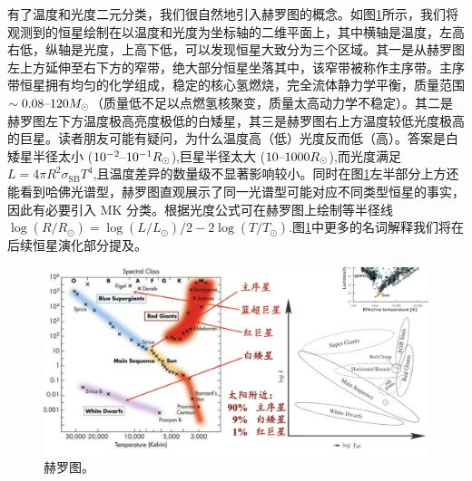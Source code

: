 \documentclass[../天体物理基础.tex]{subfiles}
\begin{document}
有了温度和光度二元分类，我们很自然地引入赫罗图的概念。如图\ref{赫罗图。}所示，我们将观测到的恒星绘制在以温度和光度为坐标轴的二维平面上，其中横轴是温度，左高右低，纵轴是光度，上高下低，可以发现恒星大致分为三个区域。其一是从赫罗图左上方延伸至右下方的窄带，绝大部分恒星坐落其中，该窄带被称作主序带。主序带恒星拥有均匀的化学组成，稳定的核心氢燃烧，完全流体静力学平衡，质量范围$\sim0.08\text{\textendash}120M_{\odot}$（质量低不足以点燃氢核聚变，质量太高动力学不稳定）。其二是赫罗图左下方温度极高亮度极低的白矮星，其三是赫罗图右上方温度较低光度极高的巨星。读者朋友可能有疑问，为什么温度高（低）光度反而低（高）。答案是白矮星半径太小 ($10^{-2}\text{\textendash}10^{-1}R_{\odot}$),巨星半径太大 ($10\text{\textendash}1000R_{\odot}$),而光度满足$L=4\pi R^{2}\sigma_{\text{SB}}T^{4}$,且温度差异的数量级不显著影响较小。同时在图\ref{赫罗图。}左半部分上方还能看到哈佛光谱型，赫罗图直观展示了同一光谱型可能对应不同类型恒星的事实，因此有必要引入 MK 分类。根据光度公式可在赫罗图上绘制等半径线$\log\left(R/R_{\odot}\right)=\log\left(L/L_{\odot}\right)/2-2\log\left(T/T_{\odot}\right)$.图\ref{赫罗图。}中更多的名词解释我们将在后续恒星演化部分提及。

\begin{figure}[!htbp]
\centering
\includegraphics[width=14cm]{figures/figure1_14.png}
\captionsetup{justification=raggedright, singlelinecheck=false}
\caption{赫罗图。}
\label{赫罗图。}
\end{figure}
\end{document}
